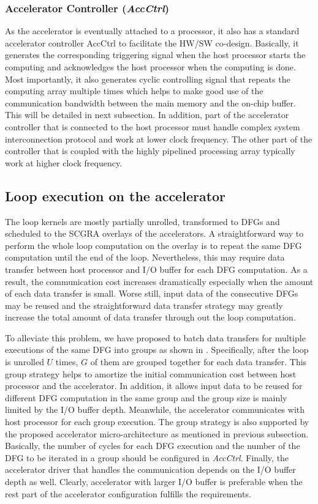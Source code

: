 \subsubsection{Accelerator Controller (\emph{AccCtrl})}
As the accelerator is eventually attached to a processor, it also has a standard accelerator controller AccCtrl to facilitate the HW/SW co-design. Basically, it generates the corresponding triggering signal when the host processor starts the computing and acknowledges the host processor when the computing is done. Most importantly, it also generates cyclic controlling signal that repeats the computing array multiple times which helps to make good use of the communication bandwidth between the main memory and the on-chip buffer. This will be detailed in next subsection. In addition, part of the accelerator controller that is connected to the host processor must handle complex system interconnection protocol and work at lower clock frequency. The other part of the controller that is coupled with the highly pipelined processing array typically work at higher clock frequency. 

\subsection{Loop execution on the accelerator}
The loop kernels are mostly partially unrolled, transformed to DFGs and scheduled to the SCGRA overlays of the accelerators. A straightforward way to perform the whole loop computation on the overlay is to repeat the same DFG computation until the end of the loop. Nevertheless, this may require data transfer between host processor and I/O buffer for each DFG computation. As a result, the communication cost increases dramatically especially when the amount of each data transfer is small. Worse still, input data of the consecutive DFGs may be reused and the straightforward data transfer strategy may greatly increase the total amount of data transfer through out the loop computation. 

To alleviate this problem, we have proposed to batch data transfers for multiple executions of the same DFG into groups as shown in . Specifically, after the loop is unrolled $U$ times, $G$ of them are grouped together for each data transfer. This group strategy helps to amortize the initial communication cost between host processor and the accelerator. In addition, it allows input data to be reused for different DFG computation in the same group and the group size is mainly limited by the I/O buffer depth. Meanwhile, the accelerator communicates with host processor for each group execution. The group strategy is also supported by the proposed accelerator micro-architecture as mentioned in previous subsection. Basically, the number of cycles for each DFG execution and the number of the DFG to be iterated in a group should be configured in \emph{AccCtrl}. Finally, the accelerator driver that handles the communication depends on the I/O buffer depth as well. Clearly, accelerator with larger I/O buffer is preferable when the rest part of the accelerator configuration fulfills the requirements. 


